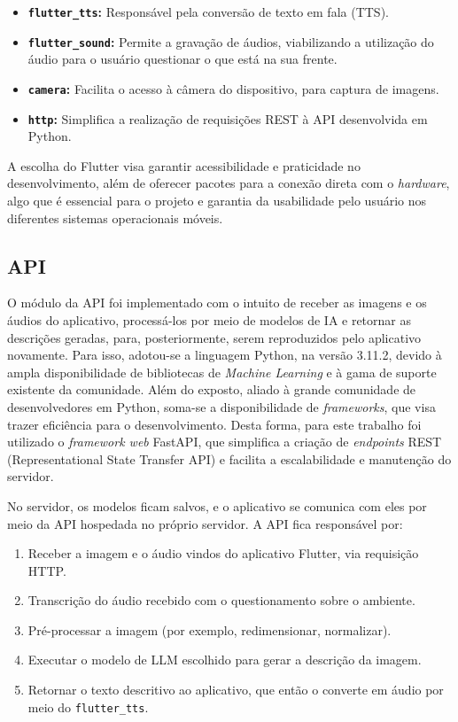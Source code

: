 \begin{itemize}
    \item \textbf{\texttt{flutter\_tts}:} Responsável pela conversão de texto em fala (TTS).
    \item \textbf{\texttt{flutter\_sound}:} Permite a gravação de áudios, viabilizando a utilização do áudio para o usuário questionar o que está na sua frente.
    \item \textbf{\texttt{camera}:} Facilita o acesso à câmera do dispositivo, para captura de imagens.
    \item \textbf{\texttt{http}:} Simplifica a realização de requisições REST à API desenvolvida em Python.
\end{itemize}

A escolha do Flutter visa garantir acessibilidade e praticidade no desenvolvimento, além de oferecer pacotes para a conexão direta com o \textit{hardware}, algo que é essencial para o projeto e garantia da usabilidade pelo usuário nos diferentes sistemas operacionais móveis.

\subsection{API}

O módulo da API foi implementado com o intuito de receber as imagens e os áudios do aplicativo, processá-los por meio de modelos de IA e retornar as descrições geradas, para, posteriormente, serem reproduzidos pelo aplicativo novamente. Para isso, adotou-se a linguagem Python, na versão 3.11.2, devido à ampla disponibilidade de bibliotecas de \textit{Machine Learning} e à gama de suporte existente da comunidade. Além do exposto, aliado à grande comunidade de desenvolvedores em Python, soma-se a disponibilidade de \textit{frameworks}, que visa trazer eficiência para o desenvolvimento. Desta forma, para este trabalho foi utilizado o \textit{framework web} FastAPI, que simplifica a criação de \textit{endpoints} REST (Representational State Transfer API) e facilita a escalabilidade e manutenção do servidor.

No servidor, os modelos ficam salvos, e o aplicativo se comunica com eles por meio da API hospedada no próprio servidor. A API fica responsável por:

\begin{enumerate}
    \item Receber a imagem e o áudio vindos do aplicativo Flutter, via requisição HTTP.
    \item Transcrição do áudio recebido com o questionamento sobre o ambiente.
    \item Pré-processar a imagem (por exemplo, redimensionar, normalizar).
    \item Executar o modelo de LLM escolhido para gerar a descrição da imagem.
    \item Retornar o texto descritivo ao aplicativo, que então o converte em áudio por meio do \texttt{flutter\_tts}.
\end{enumerate}

